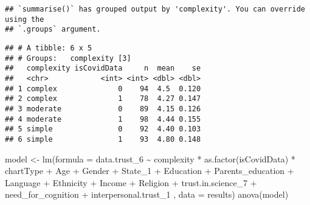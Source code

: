\documentclass[
]{article}
\newenvironment{Shaded}{\begin{snugshade}}{\end{snugshade}}
\newcommand{\AttributeTok}[1]{\textcolor[rgb]{0.77,0.63,0.00}{#1}}
\newcommand{\FunctionTok}[1]{\textcolor[rgb]{0.00,0.00,0.00}{#1}}
\newcommand{\NormalTok}[1]{#1}
\newcommand{\OtherTok}[1]{\textcolor[rgb]{0.56,0.35,0.01}{#1}}
\newcommand{\SpecialCharTok}[1]{\textcolor[rgb]{0.00,0.00,0.00}{#1}}
\begin{document}
\begin{verbatim}
## `summarise()` has grouped output by 'complexity'. You can override using the
## `.groups` argument.
\end{verbatim}

\begin{verbatim}
## # A tibble: 6 x 5
## # Groups:   complexity [3]
##   complexity isCovidData     n  mean    se
##   <chr>            <int> <int> <dbl> <dbl>
## 1 complex              0    94  4.5  0.120
## 2 complex              1    78  4.27 0.147
## 3 moderate             0    89  4.15 0.126
## 4 moderate             1    98  4.44 0.155
## 5 simple               0    92  4.40 0.103
## 6 simple               1    93  4.80 0.148
\end{verbatim}

\begin{Shaded}
\begin{Highlighting}[]
\NormalTok{model }\OtherTok{\textless{}{-}} \FunctionTok{lm}\NormalTok{(}\AttributeTok{formula =}\NormalTok{ data.trust\_6 }\SpecialCharTok{\textasciitilde{}}\NormalTok{ complexity }\SpecialCharTok{*} \FunctionTok{as.factor}\NormalTok{(isCovidData) }\SpecialCharTok{*}\NormalTok{ chartType}
                                    \SpecialCharTok{+}\NormalTok{ Age }\SpecialCharTok{+}\NormalTok{ Gender }\SpecialCharTok{+}\NormalTok{ State\_1 }\SpecialCharTok{+}\NormalTok{ Education }\SpecialCharTok{+}\NormalTok{ Parents\_education }\SpecialCharTok{+}\NormalTok{ Language }\SpecialCharTok{+}\NormalTok{ Ethnicity }\SpecialCharTok{+}\NormalTok{ Income }\SpecialCharTok{+}\NormalTok{ Religion }\SpecialCharTok{+}\NormalTok{ trust.in.science\_7 }\SpecialCharTok{+}\NormalTok{ need\_for\_cognition }\SpecialCharTok{+}\NormalTok{ interpersonal.trust\_1 ,}
            \AttributeTok{data =}\NormalTok{ results)}
\FunctionTok{anova}\NormalTok{(model)}
\end{Highlighting}
\end{Shaded}
\end{document}
